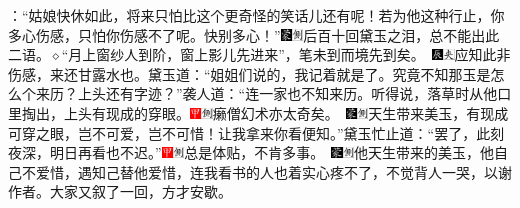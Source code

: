 {：“姑娘快休如此，将来只怕比这个更奇怪的笑话儿还有呢！若为他这种行止，你多心伤感，只怕你伤感不了呢。快别多心！”{\includegraphics[width=3mm]{../Images/00006}\includegraphics[width=3mm]{../Images/00011}\footnotesize \kaishu 后百十回黛玉之泪，总不能出此二语。{$\diamond$}“月上窗纱人到阶，窗上影儿先进来”，笔未到而境先到矣。　\includegraphics[width=3mm]{../Images/00009}\includegraphics[width=3mm]{../Images/00012}\footnotesize \kaishu 应知此非伤感，来还甘露水也。}黛玉道：“姐姐们说的，我记着就是了。究竟不知那玉是怎么个来历？上头还有字迹？”袭人道：“连一家也不知来历。听得说，落草时从他口里掏出，上头有现成的穿眼。{{\includegraphics[width=3mm]{../Images/00002}\includegraphics[width=3mm]{../Images/00011}\footnotesize \kaishu 癞僧幻术亦太奇矣。　}\includegraphics[width=3mm]{../Images/00006}\includegraphics[width=3mm]{../Images/00011}\footnotesize \kaishu 天生带来美玉，有现成可穿之眼，岂不可爱，岂不可惜！}让我拿来你看便知。”黛玉忙止道：“罢了，此刻夜深，明日再看也不迟。”{{\includegraphics[width=3mm]{../Images/00002}\includegraphics[width=3mm]{../Images/00011}\footnotesize \kaishu 总是体贴，不肯多事。　}\includegraphics[width=3mm]{../Images/00006}\includegraphics[width=3mm]{../Images/00011}\footnotesize \kaishu 他天生带来的美玉，他自己不爱惜，遇知己替他爱惜，连我看书的人也着实心疼不了，不觉背人一哭，以谢作者。}大家又叙了一回，方才安歇。

}
